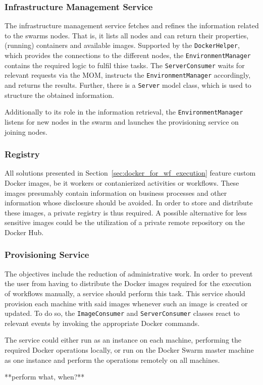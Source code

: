   \subsubsection{Infrastructure Management Service} %
    \label{subs:environment_management_service}
    The infrastructure management service fetches and refines the information related to the swarms nodes.
    That is, it lists all nodes and can return their properties, (running) containers and available images.
    Supported by the \texttt{DockerHelper}, which provides the connections to the different nodes, the \texttt{EnvironmentManager} contains the required logic to fulfil thise tasks. The \texttt{ServerConsumer} waits for relevant requests via the \ac{MOM}, instructs the \texttt{EnvironmentManager} accordingly, and returns the results. Further, there is a \texttt{Server} model class, which is used to structure the obtained information.

    Additionally to its role in the information retrieval, the \texttt{EnvironmentManager} listens for  new nodes in the swarm and launches the provisioning service on joining nodes.

  \subsubsection{Registry} %
  \label{subs:registry}
    All solutions presented in Section~\ref{sec:docker_for_wf_execution} feature custom Docker images, be it workers or contanierized activities or workflows. These images presumably contain information on business processes and other information whose disclosure should be avoided.  In order to store and distribute these images, a private registry is thus required. A possible alternative for less sensitive images could be the utilization of a private remote repository on the Docker Hub.

  \subsubsection{Provisioning Service} %
    \label{subs:provisioning_service}
    The objectives include the reduction of administrative work. In order to prevent the user from having to distribute the Docker images required for the execution of workflows manually, a service should perform this task. This service should provision each machine with said images whenever such an image is created or updated. To do so, the \texttt{ImageConsumer} and \texttt{ServerConsumer} classes react to relevant events by invoking the appropriate Docker commands.

    The service could either run as an instance on each machine, performing the required Docker operations locally, or run on the Docker Swarm master machine as one instance and perform the operations remotely on all machines.

    **perform what, when?**

